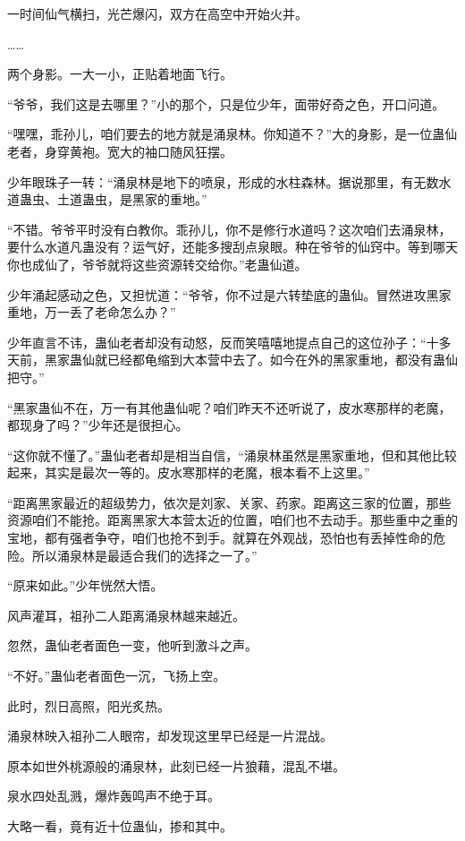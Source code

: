 \begin{this_body}
一时间仙气横扫，光芒爆闪，双方在高空中开始火并。

……

两个身影。一大一小，正贴着地面飞行。

“爷爷，我们这是去哪里？”小的那个，只是位少年，面带好奇之色，开口问道。

“嘿嘿，乖孙儿，咱们要去的地方就是涌泉林。你知道不？”大的身影，是一位蛊仙老者，身穿黄袍。宽大的袖口随风狂摆。

少年眼珠子一转：“涌泉林是地下的喷泉，形成的水柱森林。据说那里，有无数水道蛊虫、土道蛊虫，是黑家的重地。”

“不错。爷爷平时没有白教你。乖孙儿，你不是修行水道吗？这次咱们去涌泉林，要什么水道凡蛊没有？运气好，还能多搜刮点泉眼。种在爷爷的仙窍中。等到哪天你也成仙了，爷爷就将这些资源转交给你。”老蛊仙道。

少年涌起感动之色，又担忧道：“爷爷，你不过是六转垫底的蛊仙。冒然进攻黑家重地，万一丢了老命怎么办？”

少年直言不讳，蛊仙老者却没有动怒，反而笑嘻嘻地提点自己的这位孙子：“十多天前，黑家蛊仙就已经都龟缩到大本营中去了。如今在外的黑家重地，都没有蛊仙把守。”

“黑家蛊仙不在，万一有其他蛊仙呢？咱们昨天不还听说了，皮水寒那样的老魔，都现身了吗？”少年还是很担心。

“这你就不懂了。”蛊仙老者却是相当自信，“涌泉林虽然是黑家重地，但和其他比较起来，其实是最次一等的。皮水寒那样的老魔，根本看不上这里。”

“距离黑家最近的超级势力，依次是刘家、关家、药家。距离这三家的位置，那些资源咱们不能抢。距离黑家大本营太近的位置，咱们也不去动手。那些重中之重的宝地，都有强者争夺，咱们也抢不到手。就算在外观战，恐怕也有丢掉性命的危险。所以涌泉林是最适合我们的选择之一了。”

“原来如此。”少年恍然大悟。

风声灌耳，祖孙二人距离涌泉林越来越近。

忽然，蛊仙老者面色一变，他听到激斗之声。

“不好。”蛊仙老者面色一沉，飞扬上空。

此时，烈日高照，阳光炙热。

涌泉林映入祖孙二人眼帘，却发现这里早已经是一片混战。

原本如世外桃源般的涌泉林，此刻已经一片狼藉，混乱不堪。

泉水四处乱溅，爆炸轰鸣声不绝于耳。

大略一看，竟有近十位蛊仙，掺和其中。


\end{this_body}
